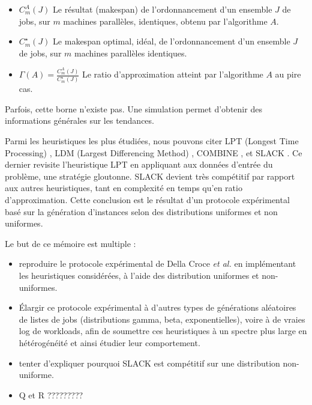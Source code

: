 \documentclass[a4paper,12pt]{report}
\theoremstyle{plain}				%
\theoremstyle{definition}				%
\begin{document}
\begin{itemize}
\item $C_m^A(J)$ Le résultat (makespan) de l'ordonnancement
	d'un ensemble $J$ de jobs,
	sur $m$ machines parallèles, identiques,
	obtenu par l'algorithme $A$.
\item $C_m^\star(J)$ Le makespan optimal, idéal, de l'ordonnancement
	d'un ensemble $J$ de jobs,
	sur $m$ machines parallèles identiques.
\item $\Gamma(A)=\frac{C_m^A(J)}{C_m^\star(J)}$
	Le ratio d'approximation atteint par l'algorithme $A$ au pire cas.
\end{itemize}
   
  Parfois, cette borne n'existe pas. Une simulation permet d'obtenir des 
  informations générales sur les tendances.

\bigskip
Parmi les heuristiques les plus étudiées, nous pouvons citer 
  LPT (Longest Time Processing) \cite{graham1966bounds}, 
  LDM (Largest Differencing Method) \cite{karmarkar1982differencing}, 
  COMBINE \cite{lee1988multiprocessor}, et 
  SLACK \cite{della2020longest}.
Ce dernier revisite l'heuristique LPT en appliquant aux données d'entrée du problème, 
  une stratégie gloutonne. 
SLACK devient très compétitif par rapport aux autres heuristiques, 
  tant en complexité en temps 
  qu'en ratio d'approximation. 
Cette conclusion est le résultat d'un protocole expérimental 
  basé sur la génération d'instances selon des 
  distributions uniformes et non uniformes.  

Le but de ce mémoire est multiple :
\begin{itemize}
\item reproduire le protocole expérimental de Della Croce \emph{et al.} 
  en implémentant les heuristiques considérées, 
  à l'aide des distribution uniformes et non-uniformes.
\item Élargir ce protocole expérimental à 
  d'autres types de générations aléatoires 
  de listes de jobs (distributions gamma, beta, exponentielles), voire 
  à de vraies log de workloads, 
  afin de soumettre ces heuristiques à un spectre plus large en 
  hétérogénéité et ainsi étudier leur comportement.    
\item tenter d'expliquer pourquoi SLACK est 
  compétitif sur une distribution non-uniforme. 
\item Q et R ?????????
\end{itemize} 
\end{document}
